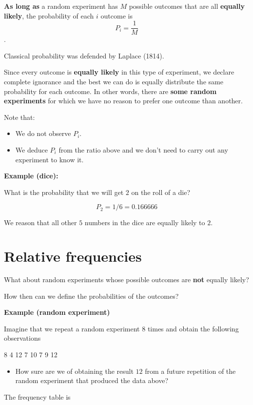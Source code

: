\documentclass[
]{book}
\providecommand{\tightlist}{%
  \setlength{\itemsep}{0pt}\setlength{\parskip}{0pt}}
\begin{document}
\textbf{As long as} a random experiment has \(M\) possible outcomes that are all \textbf{equally likely}, the probability of each \(i\) outcome is \[P_i =\frac{1}{M}\].

Classical probability was defended by Laplace (1814).

Since every outcome is \textbf{equally likely} in this type of experiment, we declare complete ignorance and the best we can do is equally distribute the same probability for each outcome. In other words, there are \textbf{some random experiments} for which we have no reason to prefer one outcome than another.

Note that:

\begin{itemize}
\tightlist
\item
  We do not observe \(P_i\).
\item
  We deduce \(P_i\) from the ratio above and we don't need to carry out any experiment to know it.
\end{itemize}

\textbf{Example (dice):}

What is the probability that we will get \(2\) on the roll of a die?

\[P_2=1/6=0.166666\]

We reason that all other \(5\) numbers in the dice are equally likely to \(2\).

\hypertarget{relative-frequencies-1}{%
\section{Relative frequencies}\label{relative-frequencies-1}}

What about random experiments whose possible outcomes are \textbf{not} equally likely?

How then can we define the probabilities of the outcomes?

\textbf{Example (random experiment)}

Imagine that we repeat a random experiment \(8\) times and obtain the following observations

8 4 12 7 10 7 9 12

\begin{itemize}
\tightlist
\item
  How sure are we of obtaining the result \(12\) from a future repetition of the random experiment that produced the data above?
\end{itemize}

The frequency table is
\end{document}

